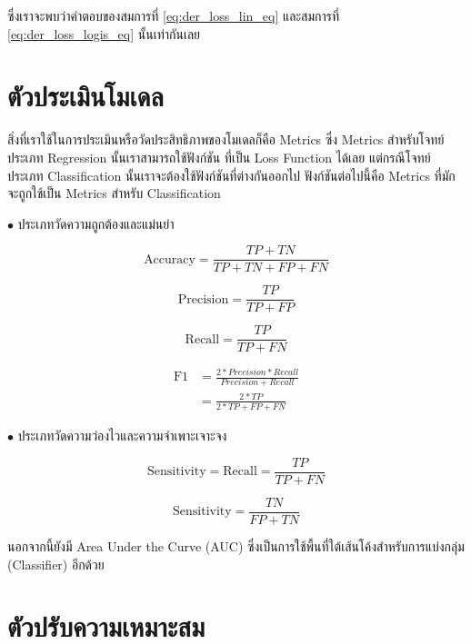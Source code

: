 \noindent ซึ่งเราจะพบว่าคำตอบของสมการที่ \ref{eq:der_loss_lin_eq} และสมการที่ \ref{eq:der_loss_logis_eq} นั้นเท่ากันเลย

\section{ตัวประเมินโมเดล}
\label{sec:metrics}

สิ่งที่เราใช้ในการประเมินหรือวัดประสิทธิภาพของโมเดลก็คือ Metrics ซึ่ง Metrics สำหรับโจทย์ประเภท Regression นั้นเราสามารถใช้ฟังก์ชัน%
ที่เป็น Loss Function ได้เลย แต่กรณีโจทย์ประเภท Classification นั้นเราจะต้องใช้ฟังก์ชันที่ต่างกันออกไป ฟังก์ชันต่อไปนี้คือ Metrics 
ที่มักจะถูกใช้เป็น Metrics สำหรับ Classification

\noindent $\bullet$ ประเภทวัดความถูกต้องและแม่นยำ

\begin{equation}
    \text{Accuracy} = \frac{TP+TN}{TP+TN+FP+FN}
\end{equation}

\begin{equation}
    \text{Precision} = \frac{TP}{TP+FP}
\end{equation}

\begin{equation}
    \text{Recall} = \frac{TP}{TP+FN}
\end{equation}

\begin{align}
    \text{F1} &= \frac{2*Precision*Recall}{Precision+Recall} \nonumber \\
    &= \frac{2*TP}{2*TP+FP+FN}
\end{align}

\noindent $\bullet$ ประเภทวัดความว่องไวและความจำเพาะเจาะจง

\begin{equation}
    \text{Sensitivity} = \text{Recall} = \frac{TP}{TP+FN}
\end{equation}

\begin{equation}
    \text{Sensitivity} = \frac{TN}{FP+TN}
\end{equation}

\noindent นอกจากนี้ยังมี Area Under the Curve (AUC) ซึ่งเป็นการใช้พื้นที่ใต้เส้นโค้งสำหรับการแบ่งกลุ่ม (Classifier) อีกด้วย

\section{ตัวปรับความเหมาะสม}
\label{sec:optimizer}

